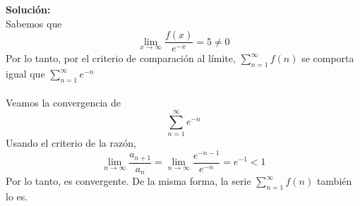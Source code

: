 \documentclass[12pt]{article}
\newenvironment{solucion}
{\begin{mdframed}[backgroundcolor=black!10]
		{\bf Solución:}\\
	}
	{
	\end{mdframed}
}
\newenvironment{preguntas}
{\begin{enumerate}\itemsep12pt
	}
	{
	\end{enumerate}
}
\newcommand{\ra}{\rightarrow}
\begin{document}
\begin{preguntas}
\begin{solucion}
Sabemos que
		$$\lim_{x\ra\infty}\dfrac{f(x)}{e^{-x}}=5 \neq 0$$
		Por lo tanto, por el criterio de comparación al límite, $\sum\limits_{n=1}^{\infty}f(n)$ se comporta igual que $\sum\limits_{n=1}^{\infty}e^{-n}$\\
		\\
		Veamos la convergencia de 
		$$\sum\limits_{n=1}^{\infty}e^{-n}$$
		Usando el criterio de la razón,
		$$\lim\limits_{n \ra \infty} \dfrac{a_{n+1}}{a_n}
		= \lim\limits_{n \ra \infty} \dfrac{e^{-n-1}}{e^{-n}}
		= e^{-1} < 1$$
		Por lo tanto, es convergente. De la misma forma, la serie $\sum\limits_{n=1}^{\infty}f(n)$ también lo es.
\end{solucion}
\end{preguntas}
\end{document}
